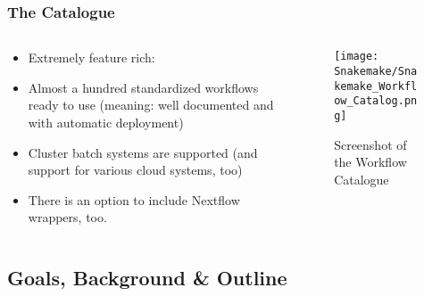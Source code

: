 \begin{frame}
  \frametitle{The \Snakemake{} Catalogue}
  \begin{columns}
    \begin{column}{0.5\textwidth}
      \begin{itemize}[<+->]
   \item Extremely feature rich: 
   \item Almost a hundred standardized workflows ready to use (meaning: well documented and with automatic deployment)
   \item Cluster batch systems are supported (and support for various cloud systems, too)
   \item There is an option to include Nextflow wrappers, too.
      \end{itemize}
    \end{column}
    \begin{column}{0.5\textwidth}
      \begin{figure}
        \texttt{[image: Snakemake/Snakemake\_Workflow\_Catalog.png]}
        \caption*{Screenshot of the Workflow Catalogue}
      \end{figure}
    \end{column}
  \end{columns}
\end{frame}


\subsection{Goals, Background \& Outline}

